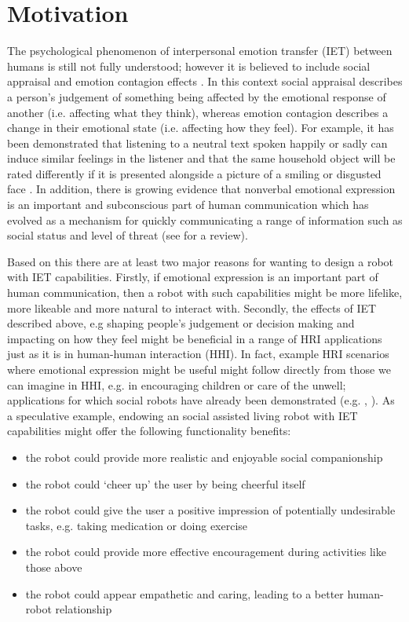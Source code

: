 \documentclass[11pt]{article}
\begin{document}
\section{Motivation}
The psychological phenomenon of interpersonal emotion transfer (IET) between humans is still not fully understood; however it is believed to include social appraisal and emotion contagion effects \cite{parkinson2011interpersonal}. In this context social appraisal describes a person's judgement of something being affected by the emotional response of another (i.e. affecting what they think), whereas emotion contagion describes a change in their emotional state (i.e. affecting how they feel). For example, it has been demonstrated that listening to a neutral text spoken happily or sadly can induce similar feelings in the listener \cite{neumann2000mood} and that the same household object will be rated differently if it is presented alongside a picture of a smiling or disgusted face \cite{bayliss2007affective}. In addition, there is growing evidence that nonverbal emotional expression is an important and subconscious part of human communication which has evolved as a mechanism for quickly communicating a range of information such as social status and level of threat (see \cite{tracy2015nonverbal} for a review). 

Based on this there are at least two major reasons for wanting to design a robot with IET capabilities. Firstly, if emotional expression is an important part of human communication, then a robot with such capabilities might be more lifelike, more likeable and more natural to interact with. Secondly, the effects of IET described above, e.g shaping people's judgement or decision making and impacting on how they feel might be beneficial in a range of HRI applications just as it is in human-human interaction (HHI). In fact, example HRI scenarios where emotional expression might be useful might follow directly from those we can imagine in HHI, e.g. in encouraging children or care of the unwell; applications for which social robots have already been demonstrated (e.g. \cite{shiomi2015can}, \cite{gockley2006encouraging}). As a speculative example, endowing an social assisted living robot with IET  capabilities might offer the following functionality benefits: 
\begin{itemize}
\item the robot could provide more realistic and enjoyable social companionship
\item the robot could `cheer up' the user by being cheerful itself
\item the robot could give the user a positive impression of potentially undesirable tasks, e.g. taking medication or doing exercise
\item the robot could provide more effective encouragement during activities like those above
\item the robot could appear empathetic and caring, leading to a better human-robot relationship
\end{itemize}
\end{document}
